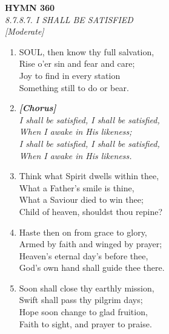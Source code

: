 \documentclass[11pt,a4paper]{article}
\begin{document}
\newpage
\begin{center}
    {\Large \textbf{HYMN 360}}
    \\
    \textit{8.7.8.7. I SHALL BE SATISFIED}
    \\
    \textit{\small [Moderate]}
\end{center}
\vspace{1em}

\begin{enumerate}
    \item SOUL, then know thy full salvation, \\
        Rise o'er sin and fear and care; \\
        Joy to find in every station \\
        Something still to do or bear.

    \item[] \vspace{0.4em}
    \textbf{\textit{[Chorus]}} \\
    \textit{I shall be satisfied, I shall be satisfied,} \\
    \textit{When I awake in His likeness;} \\
    \textit{I shall be satisfied, I shall be satisfied,} \\
    \textit{When I awake in His likeness.}
    \vspace{0.4em}

    \item Think what Spirit dwells within thee, \\
        What a Father's smile is thine, \\
        What a Saviour died to win thee; \\
        Child of heaven, shouldst thou repine?

    \item Haste then on from grace to glory, \\
        Armed by faith and winged by prayer; \\
        Heaven's eternal day's before thee, \\
        God's own hand shall guide thee there.

    \item Soon shall close thy earthly mission, \\
        Swift shall pass thy pilgrim days; \\
        Hope soon change to glad fruition, \\
        Faith to sight, and prayer to praise.

\end{enumerate}
\end{document}
